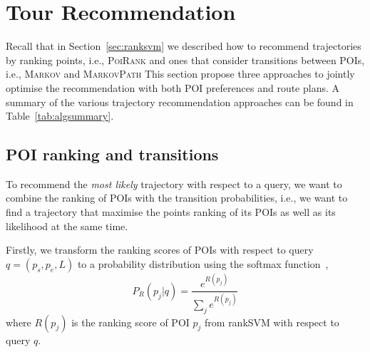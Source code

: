 
\section{Tour Recommendation}
\label{sec:recommendation}
\secmoveup

Recall that in Section~\ref{sec:ranksvm} we described how to recommend trajectories by ranking points,
i.e., \textsc{PoiRank} %
and ones that consider transitions between POIs, i.e., \textsc{Markov} and \textsc{MarkovPath}
This section propose three approaches to %
jointly optimise the recommendation with both POI preferences and route plans.
A summary of the various trajectory recommendation approaches can be found in Table~\ref{tab:algsummary}.


\subsection{POI ranking and transitions}
\label{sec:rank+markov}
\secmoveup


To recommend the \textit{most likely} trajectory with respect to a query,
we want to combine the ranking of POIs with the transition probabilities,
i.e., we want to find a trajectory that maximise the points ranking of its POIs
as well as its likelihood at the same time.

Firstly, we transform the ranking scores of POIs with respect to query $q = (p_s, p_e, L)$
to a probability distribution using the softmax function~\cite{bishop2006},
\begin{equation}
  \label{eq:poi-probability}
  P_R(p_j | q) = \frac{e^{R(p_j)}}{\sum_j e^{R(p_j)}}
\end{equation}
where $R(p_j)$ is the ranking score of POI $p_j$ from rankSVM with respect to query $q$.


